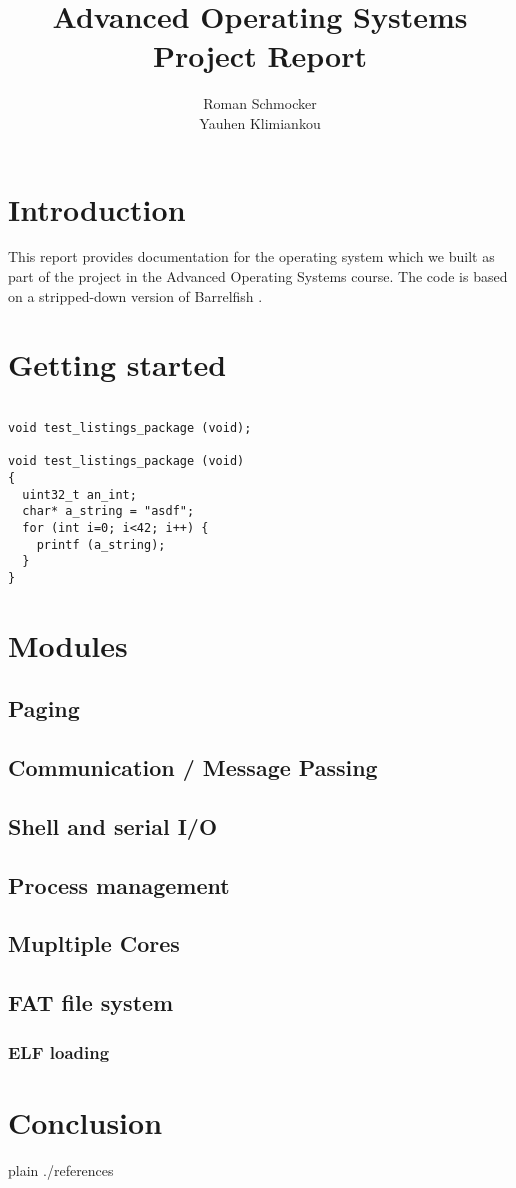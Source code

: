 \documentclass[a4paper,10pt]{article}
\title{Advanced Operating Systems \\ Project Report}
\author{Roman Schmocker \\ Yauhen Klimiankou}
\begin{document}
\maketitle


\section{Introduction}

This report provides documentation for the operating system which we built as part of the project in the Advanced Operating Systems course.
The code is based on a stripped-down version of Barrelfish \cite {web:barrelfish}.


\section{Getting started}

\begin{lstlisting}

void test_listings_package (void);

void test_listings_package (void)
{
  uint32_t an_int;
  char* a_string = "asdf";
  for (int i=0; i<42; i++) {
    printf (a_string);
  }
}
\end{lstlisting}


\section {Modules}

\subsection{Paging}
\subsection{Communication / Message Passing}
\subsection{Shell and serial I/O}
\subsection{Process management}
\subsection{Mupltiple Cores}
\subsection{FAT file system}
\subsubsection{ ELF loading}

\section{Conclusion}

\begin{flushleft}
{{{
 {plain}
 {./references}
}}}
\end{flushleft}


\todos
\end{document}
